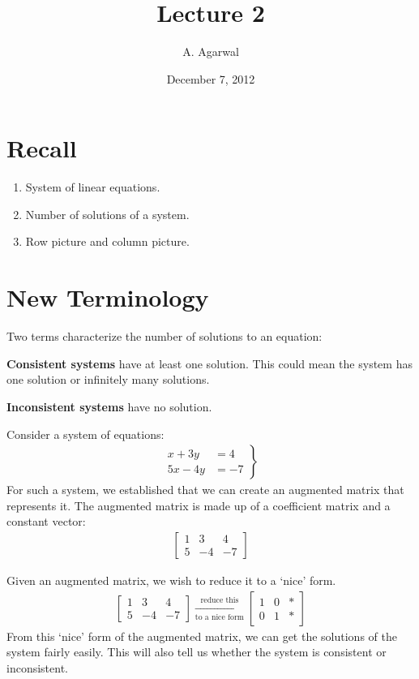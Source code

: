 \documentclass[11pt]{article}
\title{Lecture 2}
\author{A. Agarwal}
\date{December 7, 2012}
\newcommand{\keyphrase}{\textbf}
\begin{document}

\section*{Recall}
\begin{enumerate}
\item{
System of linear equations.
}
\item{
Number of solutions of a system.
}
\item{
Row picture and column picture.
}
\end{enumerate}

\section*{New Terminology}
Two terms characterize the number of solutions to an equation:

\keyphrase{Consistent systems} have at least one solution. This could mean the system has one solution or infinitely many solutions.

\keyphrase{Inconsistent systems} have no solution.


Consider a system of equations:
\begin{align*}
\left.
\begin{aligned}
x + 3y &= 4
\\
5x - 4y &= -7
\end{aligned}
\right\}
\end{align*}
For such a system, we established that we can create an augmented matrix that represents it. The augmented matrix is made up of a coefficient matrix and a constant vector:
\begin{align*}
\left[
\begin{matrix}
1 & 3 & 4
\\
5 & -4 & -7
\end{matrix}
\right]
\end{align*}

Given an augmented matrix, we wish to reduce it to a `nice' form.
\begin{align*}
\left[
\begin{matrix}
1 & 3 & 4
\\
5 & -4 & -7
\end{matrix}
\right]
\xrightarrow[\text{to a nice form}]{\text{reduce this}}
\left[
\begin{matrix}
1 & 0 & *
\\
0 & 1 & *
\end{matrix}
\right]
\end{align*}
From this `nice' form of the augmented matrix, we can get the solutions of the system fairly easily. This will also tell us whether the system is consistent or inconsistent.
\end{document}
